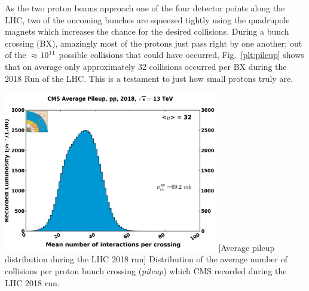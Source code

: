 As the two proton beams approach one of the four detector points along the LHC, two of the oncoming bunches are squeezed tightly using the quadrupole magnets which increases the chance for the desired \pp collisions.
During a bunch crossing (BX), amazingly most of the protons just pass right by one another; 
out of the $\approx$$\text{10}^\text{11}$ possible \pp collisions that could have occurred, Fig.~\ref{plt:pileup} shows that on average only approximately 32 collisions occurred per BX during the 2018 Run of the LHC. %
This is a testament to just how small protons truly are.
\begin{multiFigure}
    \centering
    \includegraphics[width=0.7\textwidth,keepaspectratio]{figures/lhc/pileup_pp_2018.png}
        [Average pileup distribution during the LHC 2018 run]
        {Distribution of the average number of \pp collisions per proton bunch crossing (\emph{pileup}) which CMS recorded during the LHC 2018 run.} 
    \label{plt:pileup}
\end{multiFigure}

